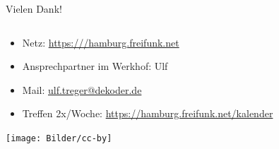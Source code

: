 \documentclass[t]{beamer}
\begin{document}
\begin{frame}{Vielen Dank!}
	\begin{columns}
		\begin{column}{1\textwidth}
			\begin{itemize}
				\item Netz: \href{https:///hamburg.freifunk.net}{https:///hamburg.freifunk.net}
				\item Ansprechpartner im Werkhof: Ulf
				\item Mail: \href{mailto:ulf.treger@dekoder.de}{ulf.treger@dekoder.de}
				\item Treffen 2x/Woche: \href{https://hamburg.freifunk.net/kalender}{https://hamburg.freifunk.net/kalender}
		\end{itemize}
			\begin{center}
				\texttt{[image: Bilder/cc-by]}
			\end{center}
		\end{column}
	\end{columns}
\end{frame}
\end{document}
